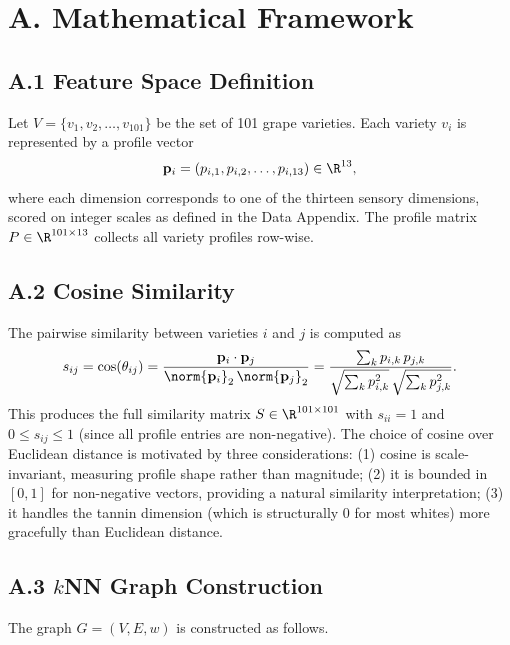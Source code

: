 \documentclass[11pt]{article}
\begin{document}

\section*{A. Mathematical Framework}

\subsection*{A.1 Feature Space Definition}
Let $V = \{v_1, v_2, \ldots, v_{101}\}$ be the set of 101 grape varieties. Each variety $v_i$ is represented by a profile vector
\[
\mathbf{p}_i = (p_{i,1}, p_{i,2}, \ldots, p_{i,13}) \in \R^{13},
\]
where each dimension corresponds to one of the thirteen sensory dimensions, scored on integer scales as defined in the Data Appendix. The profile matrix $P \in \R^{101 \times 13}$ collects all variety profiles row-wise.

\subsection*{A.2 Cosine Similarity}
The pairwise similarity between varieties $i$ and $j$ is computed as
\[
s_{ij} = \cos(\theta_{ij}) = \frac{\mathbf{p}_i \cdot \mathbf{p}_j}{\norm{\mathbf{p}_i}_2 \, \norm{\mathbf{p}_j}_2}
       = \frac{\sum_k p_{i,k}\, p_{j,k}}{\sqrt{\sum_k p_{i,k}^2}\, \sqrt{\sum_k p_{j,k}^2}}.
\]
This produces the full similarity matrix $S \in \R^{101 \times 101}$ with $s_{ii} = 1$ and $0 \leq s_{ij} \leq 1$ (since all profile entries are non-negative). The choice of cosine over Euclidean distance is motivated by three considerations: (1) cosine is scale-invariant, measuring profile shape rather than magnitude; (2) it is bounded in $[0, 1]$ for non-negative vectors, providing a natural similarity interpretation; (3) it handles the tannin dimension (which is structurally 0 for most whites) more gracefully than Euclidean distance.

\subsection*{A.3 $k$NN Graph Construction}
The graph $G = (V, E, w)$ is constructed as follows.
\end{document}

